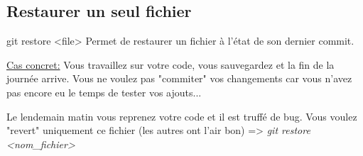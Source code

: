 \documentclass{beamer}
\begin{document}
\subsection{Restaurer un seul fichier}
\begin{frame}{git restore <file>}
Permet de restaurer un fichier à l'état de son dernier commit.\\
\medskip

\underline{Cas concret:} Vous travaillez sur votre code, vous sauvegardez et la fin de la journée arrive. Vous ne voulez pas "commiter" vos changements car vous n'avez pas encore eu le temps de tester vos ajouts...\\
\medskip

Le lendemain matin vous reprenez votre code et il est truffé de bug. Vous voulez "revert" uniquement ce fichier (les autres ont l'air bon) => \textit{git restore <nom\_fichier>}
\end{frame}
\end{document}
